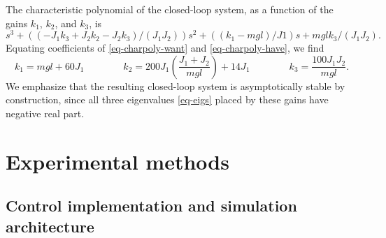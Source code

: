 \documentclass[conf]{new-aiaa}
\begin{document}
The characteristic polynomial of the closed-loop system, as a function of the gains $k_{1}$, $k_{2}$, and $k_{3}$, is
\begin{equation}
s^{3} + \left((-J_{1}k_{3} + J_{2}k_{2} - J_{2}k_{3})/(J_{1}J_{2})\right)s^{2} + \left((k_{1}-mgl)/J1\right)s + mglk_{3}/(J_{1}J_{2}).
\label{eq-charpoly-have}
\end{equation}
Equating coefficients of \eqref{eq-charpoly-want} and \eqref{eq-charpoly-have}, we find
\begin{equation}
k_{1} = mgl + 60J_{1}
\qquad\qquad
k_{2} = 200J_{1}\left(\frac{J_{1} + J_{2}}{mgl} \right) + 14J_{1}
\qquad\qquad
k_{3} = \frac{100J_{1}J_{2}}{mgl}.
\end{equation}
We emphasize that the resulting closed-loop system is asymptotically stable by construction, since all three eigenvalues \eqref{eq-eigs} placed by these gains have negative real part.





\section{Experimental methods}
\label{sec-methods}

\subsection{Control implementation and simulation architecture}
\end{document}
